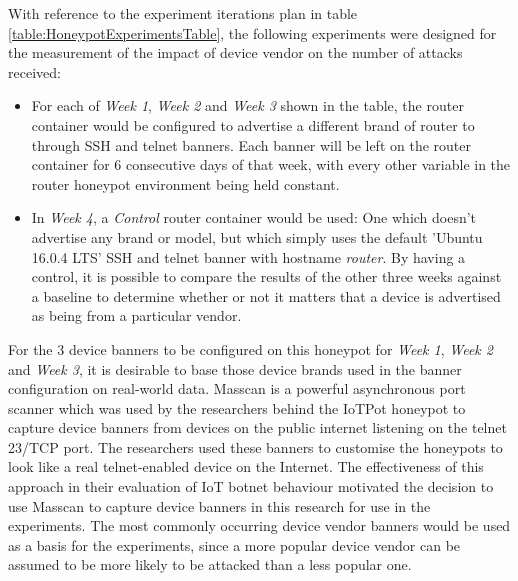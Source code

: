 

With reference to the experiment iterations plan in table \ref{table:HoneypotExperimentsTable}, the following experiments were designed for the measurement of the impact of device vendor on the number of attacks received:

\begin{itemize}
\item For each of \textit{Week 1}, \textit{Week 2} and \textit{Week 3} shown in the table, the router container would be configured to advertise a different brand of router to through SSH and telnet banners. Each banner will be left on the router container for 6 consecutive days of that week, with every other variable in the router honeypot environment being held constant.
\item In \textit{Week 4}, a \textit{Control} router container would be used: One which doesn't advertise any brand or model, but which simply uses the default 'Ubuntu 16.0.4 LTS' SSH and telnet banner with hostname \textit{router}. By having a control, it is possible to compare the results of the other three weeks against a baseline to determine whether or not it matters that a device is advertised as being from a particular vendor.
\end{itemize}

For the 3 device banners to be configured on this honeypot for \textit{Week 1}, \textit{Week 2} and \textit{Week 3}, it is desirable to base those device brands used in the banner configuration on real-world data. Masscan is a powerful asynchronous port scanner which was used by the researchers behind the IoTPot honeypot to capture device banners from devices on the public internet listening on the telnet 23/TCP port. \cite{IoTPot2016} The researchers used these banners to customise the honeypots to look like a real telnet-enabled device on the Internet. The effectiveness of this approach in their evaluation of IoT botnet behaviour motivated the decision to use Masscan to capture device banners in this research for use in the experiments. The most commonly occurring device vendor banners would be used as a basis for the experiments, since a more popular device vendor can be assumed to be more likely to be attacked than a less popular one.




